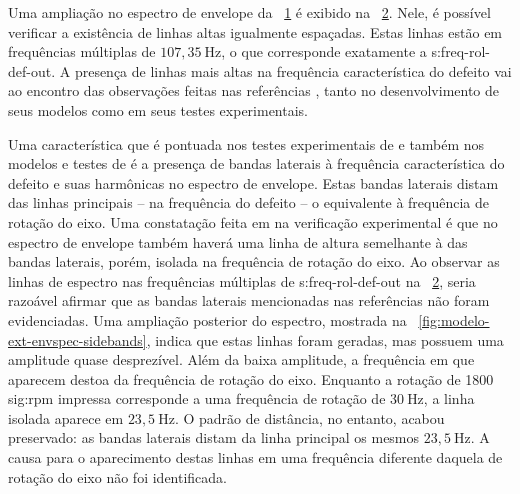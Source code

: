 \documentclass[12pt,oneside,english,brazil,lmodern,siglas,simbolos,cite=num]{ucsmonograph}
\begin{document}
	\begin{figure}[ht]
		\label{fig:modelo-ext-envspec-total}
	\end{figure}

	Uma ampliação no espectro de envelope da \figurename\ \ref{fig:modelo-ext-envspec-total} é exibido na \figurename\ \ref{fig:modelo-ext-envspec-600hz}.
	Nele, é possível verificar a existência de linhas altas igualmente espaçadas.
	Estas linhas estão em frequências múltiplas de $107,35\ \text{Hz}$, o que corresponde exatamente a \gls{s:freq-rol-def-out}.
	A presença de linhas mais altas na frequência característica do defeito vai ao encontro das observações feitas nas referências \cite{mcfadden:1984,sassi:2007,patil:2010,cong:2013}, tanto no desenvolvimento de seus modelos como em seus testes experimentais.

	\begin{figure}[ht]
		\label{fig:modelo-ext-envspec-600hz}
	\end{figure}

	Uma característica que é pontuada nos testes experimentais de \cite{mcfadden:1984} e também nos modelos e testes de \cite{sassi:2007,cong:2013} é a presença de bandas laterais à frequência característica do defeito e suas harmônicas no espectro de envelope.
	Estas bandas laterais distam das linhas principais -- na frequência do defeito -- o equivalente à frequência de rotação do eixo.
	Uma constatação feita em \cite{mcfadden:1984} na verificação experimental é que no espectro de envelope também haverá uma linha de altura semelhante à das bandas laterais, porém, isolada na frequência de rotação do eixo.
	Ao observar as linhas de espectro nas frequências múltiplas de \gls{s:freq-rol-def-out} na \figurename\ \ref{fig:modelo-ext-envspec-600hz}, seria razoável afirmar que as bandas laterais mencionadas nas referências não foram evidenciadas.
	Uma ampliação posterior do espectro, mostrada na \figurename\ \ref{fig:modelo-ext-envspec-sidebands}, indica que estas linhas foram geradas, mas possuem uma amplitude quase desprezível.
	Além da baixa amplitude, a frequência em que aparecem destoa da frequência de rotação do eixo.
	Enquanto a rotação de 1800 \gls{sig:rpm} impressa corresponde a uma frequência de rotação de $30\ \text{Hz}$, a linha isolada aparece em $23,5\ \text{Hz}$.
	O padrão de distância, no entanto, acabou preservado: as bandas laterais distam da linha principal os mesmos $23,5\ \text{Hz}$.
	A causa para o aparecimento destas linhas em uma frequência diferente daquela de rotação do eixo não foi identificada.
\end{document}
